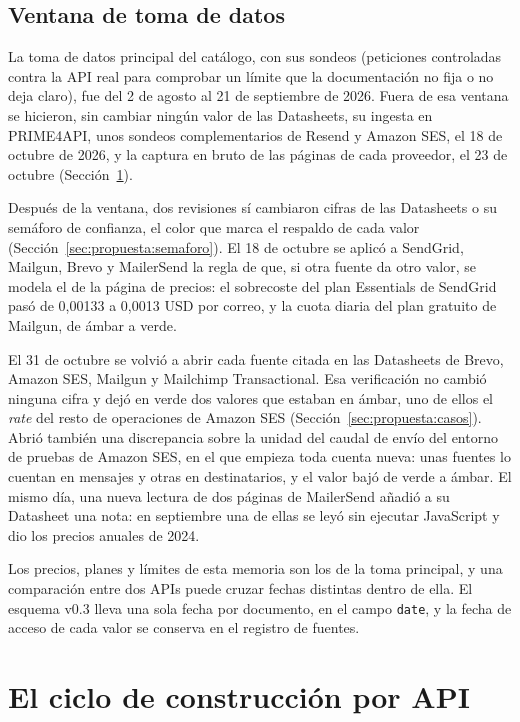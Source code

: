\subsection{Ventana de toma de datos}
\label{sec:propuesta:ventana}

La toma de datos principal del catálogo, con sus sondeos (peticiones controladas contra la API real para comprobar un límite que la documentación no fija o no deja claro), fue del 2 de agosto al 21 de septiembre de 2026.
Fuera de esa ventana se hicieron, sin cambiar ningún valor de las Datasheets, su ingesta en PRIME4API, unos sondeos complementarios de Resend y Amazon SES, el 18 de octubre de 2026, y la captura en bruto de las páginas de cada proveedor, el 23 de octubre (Sección~\ref{sec:propuesta:ciclo}).

Después de la ventana, dos revisiones sí cambiaron cifras de las Datasheets o su semáforo de confianza, el color que marca el respaldo de cada valor (Sección~\ref{sec:propuesta:semaforo}).
El 18 de octubre se aplicó a SendGrid, Mailgun, Brevo y MailerSend la regla de que, si otra fuente da otro valor, se modela el de la página de precios: el sobrecoste del plan Essentials de SendGrid pasó de 0,00133 a 0,0013 USD por correo, y la cuota diaria del plan gratuito de Mailgun, de ámbar a verde.

El 31 de octubre se volvió a abrir cada fuente citada en las Datasheets de Brevo, Amazon SES, Mailgun y Mailchimp Transactional.
Esa verificación no cambió ninguna cifra y dejó en verde dos valores que estaban en ámbar, uno de ellos el \textit{rate} del resto de operaciones de Amazon SES (Sección~\ref{sec:propuesta:casos}).
Abrió también una discrepancia sobre la unidad del caudal de envío del entorno de pruebas de Amazon SES, en el que empieza toda cuenta nueva: unas fuentes lo cuentan en mensajes y otras en destinatarios, y el valor bajó de verde a ámbar.
El mismo día, una nueva lectura de dos páginas de MailerSend añadió a su Datasheet una nota: en septiembre una de ellas se leyó sin ejecutar JavaScript y dio los precios anuales de 2024.

Los precios, planes y límites de esta memoria son los de la toma principal, y una comparación entre dos APIs puede cruzar fechas distintas dentro de ella.
El esquema v0.3 lleva una sola fecha por documento, en el campo \texttt{date}, y la fecha de acceso de cada valor se conserva en el registro de fuentes.

\section{El ciclo de construcción por API}
\label{sec:propuesta:ciclo}

